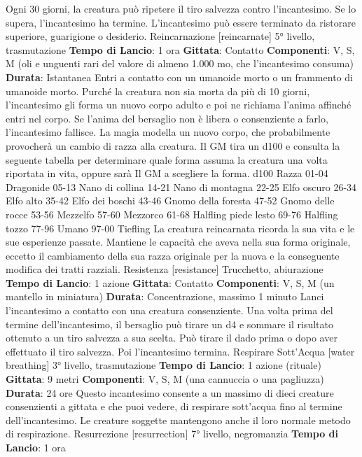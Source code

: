 \begin{multicols}{2}
Ogni 30 giorni, la creatura può ripetere il tiro salvezza
contro l’incantesimo. Se lo supera, l’incantesimo ha
termine.
L’incantesimo può essere terminato da ristorare
superiore, guarigione o desiderio.
Reincarnazione
[reincarnate]
5° livello, trasmutazione
\textbf{Tempo di Lancio}: 1 ora
\textbf{Gittata}: Contatto
\textbf{Componenti}: V, S, M (oli e unguenti rari del valore di
almeno 1.000 mo, che l’incantesimo consuma)
\textbf{Durata}: Istantanea
Entri a contatto con un umanoide morto o un frammento
di umanoide morto. Purché la creatura non sia morta da
più di 10 giorni, l’incantesimo gli forma un nuovo corpo
adulto e poi ne richiama l’anima affinché entri nel corpo.
Se l’anima del bersaglio non è libera o consenziente a
farlo, l’incantesimo fallisce.
La magia modella un nuovo corpo, che probabilmente
provocherà un cambio di razza alla creatura. Il GM tira
un d100 e consulta la seguente tabella per determinare
quale forma assuma la creatura una volta riportata in
vita, oppure sarà Il GM a scegliere la forma.
d100 Razza
01-04 Dragonide
05-13 Nano di collina
14-21 Nano di montagna
22-25 Elfo oscuro
26-34 Elfo alto
35-42 Elfo dei boschi
43-46 Gnomo della foresta
47-52 Gnomo delle rocce
53-56 Mezzelfo
57-60 Mezzorco
61-68 Halfling piede lesto
69-76 Halfling tozzo
77-96 Umano
97-00 Tiefling
La creatura reincarnata ricorda la sua vita e le sue
esperienze passate. Mantiene le capacità che aveva
nella sua forma originale, eccetto il cambiamento della
sua razza originale per la nuova e la conseguente
modifica dei tratti razziali.
Resistenza
[resistance]
Trucchetto, abiurazione
\textbf{Tempo di Lancio}: 1 azione
\textbf{Gittata}: Contatto
\textbf{Componenti}: V, S, M (un mantello in miniatura)
\textbf{Durata}: Concentrazione, massimo 1 minuto
Lanci l’incantesimo a contatto con una creatura
consenziente. Una volta prima del termine
dell’incantesimo, il bersaglio può tirare un d4 e
sommare il risultato ottenuto a un tiro salvezza a sua
scelta. Può tirare il dado prima o dopo aver effettuato il
tiro salvezza. Poi l’incantesimo termina.
Respirare Sott’Acqua
[water breathing]
3° livello, trasmutazione
\textbf{Tempo di Lancio}: 1 azione (rituale)
\textbf{Gittata}: 9 metri
\textbf{Componenti}: V, S, M (una cannuccia o una pagliuzza)
\textbf{Durata}: 24 ore
Questo incantesimo consente a un massimo di dieci
creature consenzienti a gittata e che puoi vedere, di
respirare sott’acqua fino al termine dell’incantesimo. Le
creature soggette mantengono anche il loro normale
metodo di respirazione.
Resurrezione
[resurrection]
7° livello, negromanzia
\textbf{Tempo di Lancio}: 1 ora

\end{multicols}
